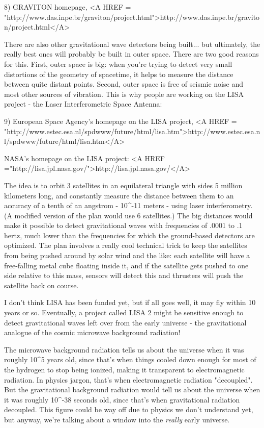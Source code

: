 8) GRAVITON homepage, <A HREF = "http://www.das.inpe.br/graviton/project.html">http://www.das.inpe.br/graviton/project.html</A>

There are also other gravitational wave detectors being built...
but ultimately, the really best ones will probably be built in 
outer space.  There are two good reasons for this.  First, outer 
space is big: when you're trying to detect very small distortions 
of the geometry of spacetime, it helps to measure the distance
between quite distant points.  Second, outer space is free of 
seismic noise and most other sources of vibration.  This is why 
people are working on the LISA project - the Laser Interferometric 
Space Antenna:

9) European Space Agency's homepage on the LISA project, 
<A HREF = "http://www.estec.esa.nl/spdwww/future/html/lisa.htm">http://www.estec.esa.nl/spdwww/future/html/lisa.htm</A>

NASA's homepage on the LISA project: <A HREF ="http://lisa.jpl.nasa.gov/">http://lisa.jpl.nasa.gov/</A>

The idea is to orbit 3 satellites in an equilateral triangle with
sides 5 million kilometers long, and constantly measure the distance 
between them to an accuracy of a tenth of an angstrom - 10^{-11} 
meters - using laser interferometry.  (A modified version of the plan 
would use 6 satellites.)  The big distances would make it possible to 
detect gravitational waves with frequencies of .0001 to .1 hertz, much
lower than the frequencies for which the ground-based detectors are 
optimized.  The plan involves a really cool technical trick to keep 
the satellites from being pushed around by solar wind and the like: 
each satellite will have a free-falling metal cube floating inside it, 
and if the satellite gets pushed to one side relative to this mass, 
sensors will detect this and thrusters will push the satellite back 
on course.

I don't think LISA has been funded yet, but if all goes well, it
may fly within 10 years or so.  Eventually, a project called LISA 2 
might be sensitive enough to detect gravitational waves left over 
from the early universe - the gravitational analogue of the cosmic
microwave background radiation!   

The microwave background radiation tells us about the universe 
when it was roughly 10^5 years old, since that's when things 
cooled down enough for most of the hydrogen to stop being ionized, 
making it transparent to electromagnetic radiation.   In physics
jargon, that's when electromagnetic radiation "decoupled".  But 
the gravitational background radiation would tell us about the 
universe when it was roughly 10^{-38} seconds old, since that's
when gravitational radiation decoupled.  This figure could be way
off due to physics we don't understand yet, but anyway, we're 
talking about a window into the \emph{really} early universe.

